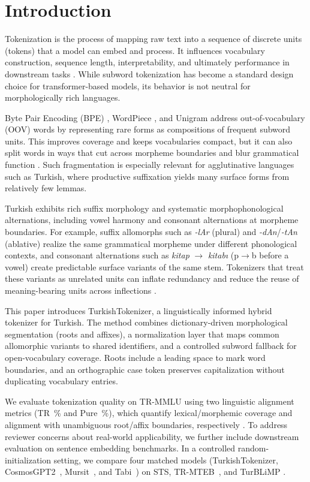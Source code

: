 \section{Introduction}
Tokenization is the process of mapping raw text into a sequence of discrete units (tokens) that a model can embed and process. It influences vocabulary construction, sequence length, interpretability, and ultimately performance in downstream tasks \cite{liu_roberta_2019}. While subword tokenization has become a standard design choice for transformer-based models, its behavior is not neutral for morphologically rich languages.

Byte Pair Encoding (BPE) \cite{sennrich_neural_2016}, WordPiece \cite{schuster_japanese_2012}, and Unigram \cite{kudo_sentencepiece_2018} address out-of-vocabulary (OOV) words by representing rare forms as compositions of frequent subword units. This improves coverage and keeps vocabularies compact, but it can also split words in ways that cut across morpheme boundaries and blur grammatical function \cite{toraman_impact_2023, kaya_effect_2024}. Such fragmentation is especially relevant for agglutinative languages such as Turkish, where productive suffixation yields many surface forms from relatively few lemmas.

Turkish exhibits rich suffix morphology and systematic morphophonological alternations, including vowel harmony and consonant alternations at morpheme boundaries. For example, suffix allomorphs such as \textit{-lAr} (plural) and \textit{-dAn}/\textit{-tAn} (ablative) realize the same grammatical morpheme under different phonological contexts, and consonant alternations such as \textit{kitap} $\rightarrow$ \textit{kitabı} (p$\rightarrow$b before a vowel) create predictable surface variants of the same stem. Tokenizers that treat these variants as unrelated units can inflate redundancy and reduce the reuse of meaning-bearing units across inflections \cite{bayram_tokenization_2025}.

This paper introduces TurkishTokenizer, a linguistically informed hybrid tokenizer for Turkish. The method combines dictionary-driven morphological segmentation (roots and affixes), a normalization layer that maps common allomorphic variants to shared identifiers, and a controlled subword fallback for open-vocabulary coverage. Roots include a leading space to mark word boundaries, and an orthographic case token preserves capitalization without duplicating vocabulary entries.

We evaluate tokenization quality on TR-MMLU \cite{bayram_setting_2025} using two linguistic alignment metrics (TR~\% and Pure~\%), which quantify lexical/morphemic coverage and alignment with unambiguous root/affix boundaries, respectively \cite{bayram_tokenization_2025}. To address reviewer concerns about real-world applicability, we further include downstream evaluation on sentence embedding benchmarks. In a controlled random-initialization setting, we compare four matched models (TurkishTokenizer, CosmosGPT2~\cite{kesgin2024introducing}, Mursit~\cite{mecellem2026}, and Tabi~\cite{turker_tabibert_2026}) on STS, TR-MTEB~\cite{baysan-gungor-2025-tr}, and TurBLiMP \cite{basar_turblimp_2025}.

